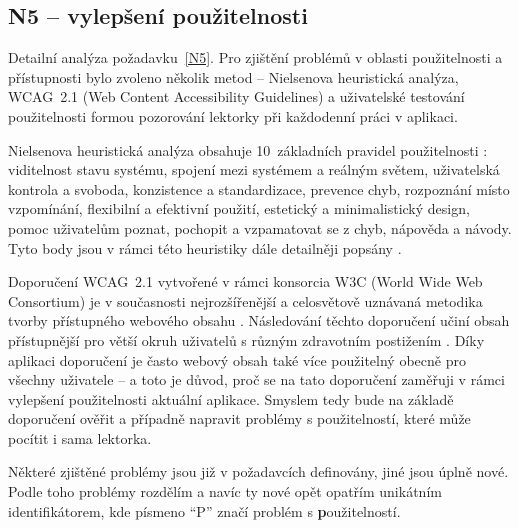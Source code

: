\subsection{N5 -- vylepšení použitelnosti}

Detailní analýza požadavku~\ref{N5}.
Pro zjištění problémů v oblasti použitelnosti a přístupnosti bylo zvoleno několik metod -- Nielsenova heuristická analýza, WCAG~2.1 (Web Content Accessibility Guidelines) a uživatelské testování použitelnosti formou pozorování lektorky při každodenní práci v aplikaci. 

Nielsenova heuristická analýza obsahuje 10~základních pravidel použitelnosti \cite{nielson}: viditelnost stavu systému, spojení mezi systémem a reálným světem, uživatelská kontrola a svoboda, konzistence a standardizace, prevence chyb, rozpoznání místo vzpomínání, flexibilní a efektivní použití, estetický a minimalistický design, pomoc uživatelům poznat, pochopit a vzpamatovat se z chyb, nápověda a návody. Tyto body jsou v rámci této heuristiky dále detailněji popsány \cite{nielson}.

Doporučení WCAG~2.1 vytvořené v rámci konsorcia W3C (World Wide Web Consortium) je v současnosti nejrozšířenější a celosvětově uznávaná metodika tvorby přístupného webového obsahu \cite{wcag-zdrojak}. Následování těchto doporučení učiní obsah přístupnější pro větší okruh uživatelů s různým zdravotním postižením \cite{wcag}. Díky aplikaci doporučení je často webový obsah také více použitelný obecně pro všechny uživatele \cite{wcag} -- a toto je důvod, proč se na tato doporučení zaměřuji v rámci vylepšení použitelnosti aktuální aplikace. Smyslem tedy bude na základě doporučení ověřit a případně napravit problémy s použitelností, které může pocítit i sama lektorka.

Některé zjištěné problémy jsou již v požadavcích definovány, jiné jsou úplně nové. Podle toho problémy rozdělím a navíc ty nové opět opatřím unikátním identifikátorem, kde písmeno \enquote{P} značí problém s \textbf{p}oužitelností.


